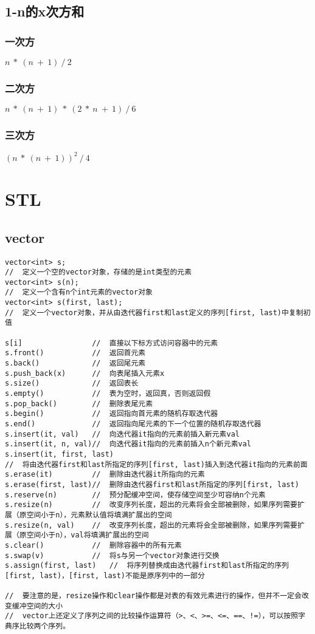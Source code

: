 \subsection{1-n的x次方和}
\subsubsection{一次方}
$n\ *\ (n\ +\ 1)\ /\ 2$

\subsubsection{二次方}
$n\ *\ (n\ +\ 1)\ *\ (2\ *\ n\ +\ 1)\ /\ 6$

\subsubsection{三次方}
$(n\ *\ (n\ +\ 1))^2\ /\ 4$

\section{STL}
\subsection{vector}
\begin{lstlisting}
vector<int> s;      
//  定义一个空的vector对象，存储的是int类型的元素
vector<int> s(n);   
//  定义一个含有n个int元素的vector对象
vector<int> s(first, last); 
//  定义一个vector对象，并从由迭代器first和last定义的序列[first, last)中复制初值

s[i]                //  直接以下标方式访问容器中的元素
s.front()           //  返回首元素
s.back()            //  返回尾元素
s.push_back(x)      //  向表尾插入元素x
s.size()            //  返回表长
s.empty()           //  表为空时，返回真，否则返回假
s.pop_back()        //  删除表尾元素
s.begin()           //  返回指向首元素的随机存取迭代器
s.end()             //  返回指向尾元素的下一个位置的随机存取迭代器
s.insert(it, val)   //  向迭代器it指向的元素前插入新元素val
s.insert(it, n, val)//  向迭代器it指向的元素前插入n个新元素val
s.insert(it, first, last)   
//  将由迭代器first和last所指定的序列[first, last)插入到迭代器it指向的元素前面
s.erase(it)         //  删除由迭代器it所指向的元素
s.erase(first, last)//  删除由迭代器first和last所指定的序列[first, last)
s.reserve(n)        //  预分配缓冲空间，使存储空间至少可容纳n个元素
s.resize(n)         //  改变序列长度，超出的元素将会全部被删除，如果序列需要扩展（原空间小于n），元素默认值将填满扩展出的空间
s.resize(n, val)    //	改变序列长度，超出的元素将会全部被删除，如果序列需要扩展（原空间小于n），val将填满扩展出的空间
s.clear()           //  删除容器中的所有元素
s.swap(v)           //  将s与另一个vector对象进行交换
s.assign(first, last)	//  将序列替换成由迭代器first和last所指定的序列[first, last)，[first, last)不能是原序列中的一部分

//  要注意的是，resize操作和clear操作都是对表的有效元素进行的操作，但并不一定会改变缓冲空间的大小
//  vector上还定义了序列之间的比较操作运算符（>、<、>=、<=、==、!=），可以按照字典序比较两个序列。
\end{lstlisting}


